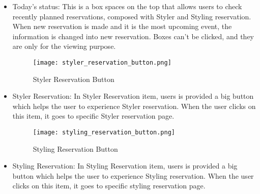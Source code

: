 \documentclass[conference]{IEEEtran}
\begin{document}
\newpage
\begin{itemize}
    \begin{figure}[htbp]
    \centerline{\texttt{[image: main\_page\_process.png]}}
    \label{fig}
    \caption{Main Page Top Box}
    \end{figure}
    \item Today’s status: This is a box spaces on the top that allows users to check recently planned reservations, composed with Styler and Styling reservation. When new reservation is made and it is the most upcoming event, the information is changed into new reservation. Boxes can’t be clicked, and they are only for the viewing purpose.\\

     \begin{figure}[htbp]
    \centerline{\texttt{[image: styler\_reservation\_button.png]}}
    \label{fig}
    \caption{Styler Reservation Button}
    \end{figure}
    \item Styler Reservation: In Styler Reservation item, users is provided a big button which helps the user to experience Styler reservation. When the user clicks on this item, it goes to specific Styler reservation page.\\
    
    \begin{figure}[htbp]
    \centerline{\texttt{[image: styling\_reservation\_button.png]}}
    \label{fig}
    \caption{Styling Reservation Button}
    \end{figure}
    \item Styling Reservation: In Styling Reservation item, users is provided a big button which helps the user to experience Styling reservation. When the user clicks on this item, it goes to specific styling reservation page.\\
\end{itemize}
\end{document}
